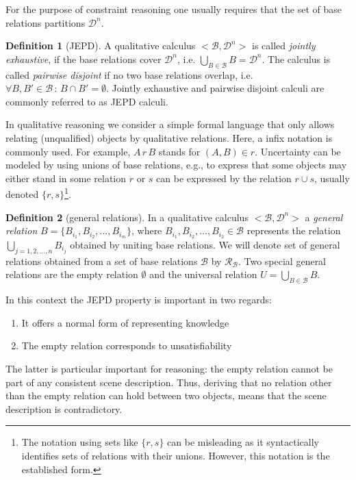 \documentclass[headsepline]{scrreprt}
\theoremstyle{definition}
\newtheorem{defn}{Definition}
\begin{document}
For the purpose of constraint reasoning one usually requires that the set of base relations
partitions $\mathcal{D}^n$.

\begin{defn}[JEPD]
	A qualitative calculus $<\mathcal{B}, \mathcal{D}^n>$ is called {\em jointly exhaustive}, if the base relations cover $\mathcal{D}^n$, i.e. $\bigcup_{B\in \mathcal{B}} B = \mathcal{D}^n$. The calculus is called {\em pairwise disjoint} if no two base relations overlap, i.e. $\forall B,B' \in \mathcal{B} \, :\, B \cap B' = \emptyset$. Jointly exhaustive and pairwise disjoint calculi are commonly referred to as JEPD calculi.
\end{defn}


In qualitative reasoning we consider a simple formal language that only allows relating (unqualified) objects by qualitative relations. Here, a infix notation is commonly used. For example, $A\, r\, B$ stands for $(A,B) \in r$. Uncertainty can be modeled by using
unions of base relations, e.g., to express that some objects may either stand in some relation $r$ or $s$ can be expressed by the relation $r \cup s$, usually denoted $\{r,s\}$\footnote{The notation using sets like $\{r,s\}$ can be misleading as it syntactically identifies sets of relations with their unions. However, this notation is the established form.}.

\begin{defn}[general relations]
	In a qualitative calculus $<\mathcal{B}, \mathcal{D}^n>$ a {\em general relation} $B =\{ B_{i_{1}}, B_{i_{2}}, \ldots, B_{i_{m}}\}$, where  $B_{i_{1}}, B_{i_{2}}, \ldots, B_{i_{2}} \in \mathcal{B}$ represents the relation $\bigcup_{j=1,2,\ldots,n} B_{i_{j}}$ obtained by uniting base relations. We will denote set of general relations obtained from a set of base relations $\mathcal{B}$ by $\mathcal{R}_{\mathcal{B}}$.
	Two special general relations are the empty relation $\emptyset$ and the universal relation $U=\bigcup_{B\in \mathcal{B}} B$.
\end{defn}

In this context the JEPD property is important in two regards:
\begin{enumerate}
	\item It offers a normal form of representing knowledge
	\item The empty relation corresponds to unsatisfiability
\end{enumerate}

The latter is particular important for reasoning: the empty relation cannot be part of any consistent scene description. Thus, deriving that no relation other than the empty relation can hold between two objects, means that the scene description is contradictory.
\end{document}
